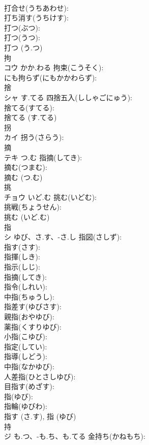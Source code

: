 \documentclass[8pt]{extreport}
\begin{document}
\begin{CJK}{UTF8}{min}
\\	打合せ(うちあわせ): 
\\	打ち消す(うちけす): 
\\	打つ(ぶつ): 
\\	打つ(うつ): 
\\	打つ (う.つ)
\\	拘			
\\	コウ	かか.わる	拘束(こうそく): 
\\	にも拘らず(にもかかわらず): 
\\	捨			
\\	シャ	す.てる	四捨五入(ししゃごにゅう): 
\\	捨てる(すてる): 
\\	捨てる (す.てる)
\\	拐			
\\	カイ		拐う(さらう): 
\\	摘			
\\	テキ	つ.む	指摘(してき): 
\\	摘む(つまむ): 
\\	摘む (つ.む)
\\	挑			
\\	チョウ	いど.む	挑む(いどむ): 
\\	挑戦(ちょうせん): 
\\	挑む (いど.む)
\\	指			
\\	シ	ゆび、さ.す、-さ.し	指図(さしず): 
\\	指す(さす): 
\\	指揮(しき): 
\\	指示(しじ): 
\\	指摘(してき): 
\\	指令(しれい): 
\\	中指(ちゅうし): 
\\	指差す(ゆびさす): 
\\	親指(おやゆび): 
\\	薬指(くすりゆび): 
\\	小指(こゆび): 
\\	指定(してい): 
\\	指導(しどう): 
\\	中指(なかゆび): 
\\	人差指(ひとさしゆび): 
\\	目指す(めざす): 
\\	指(ゆび): 
\\	指輪(ゆびわ): 
\\	指す (さ.す), 指 (ゆび)
\\	持			
\\	ジ	も.つ、-も.ち、も.てる	金持ち(かねもち): 

\end{CJK}
\end{document}
